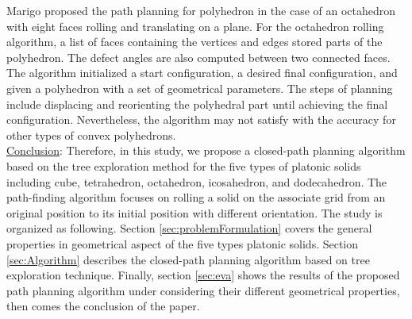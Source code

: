 \noindent Marigo \cite{Marigo00_PlanningMotion_Polyhedra_Rolling} proposed the path planning for polyhedron in the case of an octahedron with eight faces rolling and translating on a plane. 
For the octahedron rolling algorithm, a list of faces containing the vertices and edges stored parts of the polyhedron. 
The defect angles are also computed between two connected faces.
The algorithm initialized a start configuration, a desired final configuration, and given a polyhedron with a set of geometrical parameters. 
The steps of planning include displacing and reorienting the polyhedral part until achieving the final configuration. 
Nevertheless, the algorithm may not satisfy with the accuracy for other types of convex polyhedrons.\\

\noindent \uline{Conclusion}:
Therefore, in this study, we propose a closed-path planning algorithm based on the tree exploration method for the five types of platonic solids including cube, tetrahedron, octahedron, icosahedron, and dodecahedron. The path-finding algorithm focuses on rolling a solid on the associate grid from an original position to its initial position with different orientation. 
%
The study is organized as following. Section \ref{sec:problemFormulation} covers the general properties in geometrical aspect of the five types platonic solids. Section \ref{sec:Algorithm} describes the closed-path planning algorithm based on tree exploration technique. Finally, section \ref{sec:eva} shows the results of the proposed path planning algorithm under considering their different geometrical properties, then comes the conclusion of the paper.

